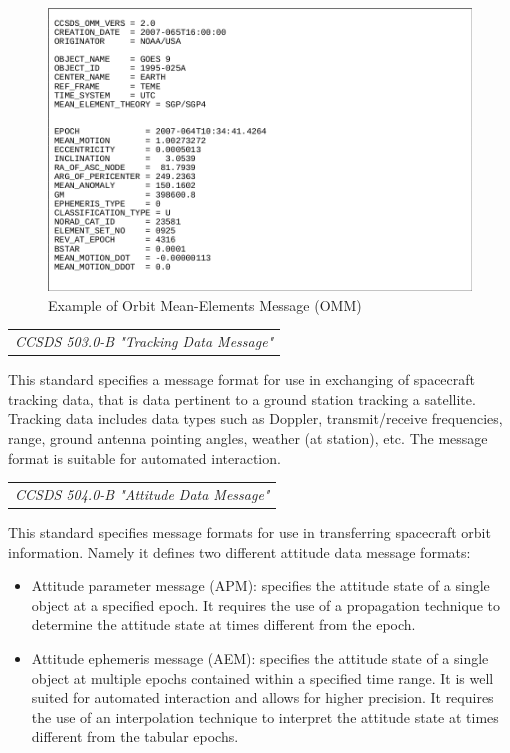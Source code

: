 \begin{figure}[h]
\centering\includegraphics[scale=0.35]{fig/example_of_omm}
\caption{Example of Orbit Mean-Elements Message (OMM)}
\label{fig:Example of Orbit Mean-Elements Message}
\end{figure}

\begin{tabular}{l}
\textit{CCSDS 503.0-B "Tracking Data Message" \cite{CCSDS 503.0-B}} \\
\end{tabular}

This standard specifies a message format for use in exchanging of spacecraft tracking data, that is data pertinent to a ground station tracking a satellite. Tracking data includes data types such as Doppler, transmit/receive frequencies, range, ground antenna pointing angles, weather (at station), etc. The message format is suitable for automated interaction.

\begin{tabular}{l}
\textit{CCSDS 504.0-B "Attitude Data Message" \cite{CCSDS 504.0-B}} \\
\end{tabular}

This standard specifies message formats for use in transferring spacecraft orbit information. Namely it defines two different attitude data message formats:

\begin{itemize}
\item Attitude parameter message (APM): specifies the attitude state of a single object at a specified epoch. It requires the use of a propagation technique to determine the attitude state at times different from the epoch.
\item Attitude ephemeris message (AEM): specifies the attitude state of a single object at multiple epochs contained within a specified time range. It is well suited for automated interaction and allows for higher precision. It requires the use of an interpolation technique to interpret the attitude state at times different from the tabular epochs. 
\end{itemize}

